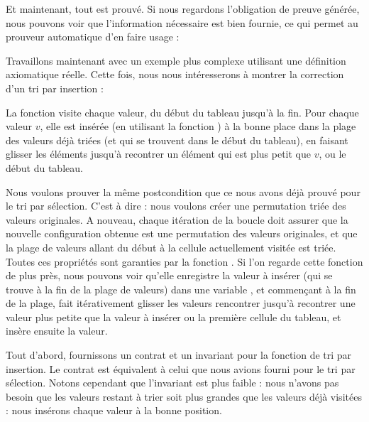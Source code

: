 


Et maintenant, tout est prouvé. Si nous regardons l'obligation de preuve générée,
nous pouvons voir que l'information nécessaire est bien fournie, ce qui permet
au prouveur automatique d'en faire usage :






Travaillons maintenant avec un exemple plus complexe utilisant une définition
axiomatique réelle. Cette fois, nous nous intéresserons à montrer la correction
d'un tri par insertion :




La fonction  visite chaque valeur, du début du tableau
jusqu'à la fin. Pour chaque valeur $v$, elle est insérée (en utilisant la fonction
) à la bonne place dans la plage des valeurs déjà triées (et qui
se trouvent dans le début du tableau), en faisant glisser les éléments jusqu'à
recontrer un élément qui est plus petit que $v$, ou le début du tableau.



Nous voulons prouver la même postcondition que ce nous avons déjà prouvé pour le
tri par sélection. C'est à dire : nous voulons créer une permutation triée des
valeurs originales. A nouveau, chaque itération de la boucle doit assurer que la
nouvelle configuration obtenue est une permutation des valeurs originales, et que
la plage de valeurs allant du début à la cellule actuellement visitée est triée.
Toutes ces propriétés sont garanties par la fonction . Si l'on
regarde cette fonction de plus près, nous pouvons voir qu'elle enregistre la
valeur à insérer (qui se trouve à la fin de la plage de valeurs) dans une variable
, et commençant à la fin de la plage, fait itérativement glisser
les valeurs rencontrer jusqu'à recontrer une valeur plus petite que la valeur à
insérer ou la première cellule du tableau, et insère ensuite la valeur.




Tout d'abord, fournissons un contrat et un invariant pour la fonction de tri
par insertion. Le contrat est équivalent à celui que nous avions fourni pour le
tri par sélection. Notons cependant que l'invariant est plus faible : nous
n'avons pas besoin que les valeurs restant à trier soit plus grandes que les
valeurs déjà visitées : nous insérons chaque valeur à la bonne position.



